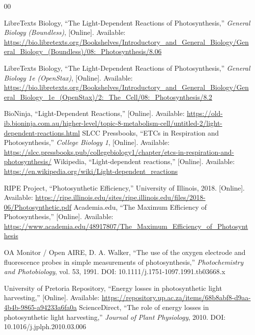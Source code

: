 \documentclass[conference]{IEEEtran}
\begin{document}
\begin{thebibliography}{00}

LibreTexts Biology, ``The Light-Dependent Reactions of Photosynthesis,'' \textit{General Biology (Boundless)}, [Online]. Available: \url{https://bio.libretexts.org/Bookshelves/Introductory\_and\_General\_Biology/General\_Biology\_(Boundless)/08:\_Photosynthesis/8.06}

LibreTexts Biology, ``The Light-Dependent Reactions of Photosynthesis,'' \textit{General Biology 1e (OpenStax)}, [Online]. Available: \url{https://bio.libretexts.org/Bookshelves/Introductory\_and\_General\_Biology/General\_Biology\_1e\_(OpenStax)/2:\_The\_Cell/08:\_Photosynthesis/8.2}

BioNinja, ``Light-Dependent Reactions,'' [Online]. Available: \url{https://old-ib.bioninja.com.au/higher-level/topic-8-metabolism-cell/untitled-2/light-dependent-reactions.html}
SLCC Pressbooks, ``ETCs in Respiration and Photosynthesis,'' \textit{College Biology 1}, [Online]. Available: \url{https://slcc.pressbooks.pub/collegebiology1/chapter/etcs-in-respiration-and-photosynthesis/}
Wikipedia, ``Light-dependent reactions,'' [Online]. Available: \url{https://en.wikipedia.org/wiki/Light-dependent\_reactions}

RIPE Project, ``Photosynthetic Efficiency,'' University of Illinois, 2018. [Online]. Available: \url{https://ripe.illinois.edu/sites/ripe.illinois.edu/files/2018-06/Photosynthetic.pdf}
Academia.edu, ``The Maximum Efficiency of Photosynthesis,'' [Online]. Available: \url{https://www.academia.edu/48917807/The\_Maximum\_Efficiency\_of\_Photosynthesis}

OA Monitor / Open AIRE, D. A. Walker, ``The use of the oxygen electrode and fluorescence probes in simple measurements of photosynthesis,'' \textit{Photochemistry and Photobiology}, vol. 53, 1991. DOI: 10.1111/j.1751-1097.1991.tb03668.x

University of Pretoria Repository, ``Energy losses in photosynthetic light harvesting,'' [Online]. Available: \url{https://repository.up.ac.za/items/68b8abf8-d9aa-4b4b-9865-a94233a6fa0a}
ScienceDirect, ``The role of energy losses in photosynthetic light harvesting,'' \textit{Journal of Plant Physiology}, 2010. DOI: 10.1016/j.jplph.2010.03.006


\end{thebibliography}
\end{document}
